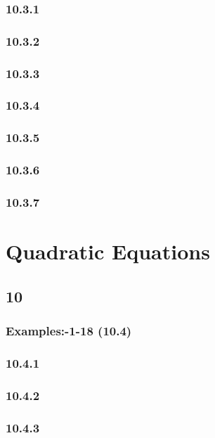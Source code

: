 \documentclass[11pt]{book}
\begin{document}
\subsection{10.3.1}

\subsection{10.3.2}

\subsection{10.3.3}

\subsection{10.3.4}

\subsection{10.3.5}

\subsection{10.3.6}

\subsection{10.3.7}

\chapter{Quadratic Equations}
\section{10}
\subsection{Examples:-1-18 (10.4)}                                               

\subsection{10.4.1}

\subsection{10.4.2}

\subsection{10.4.3}

\end{document}
